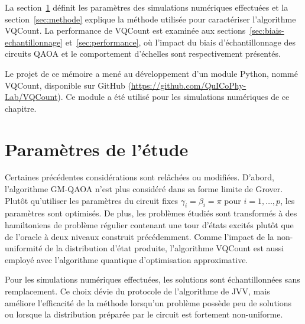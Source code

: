 La section~\ref{sec:parametres-de-etude} définit les paramètres des simulations numériques effectuées et la section~\ref{sec:methode} explique la méthode utilisée pour caractériser l'algorithme VQCount. La performance de VQCount est examinée aux sections~\ref{sec:biais-echantillonnage} et~\ref{sec:performance}, où l'impact du biais d'échantillonnage des circuits QAOA et le comportement d'échelles sont respectivement présentés.

Le projet de ce mémoire a mené au développement d'un module Python, nommé VQCount, disponible sur GitHub (\url{https://github.com/QuICoPhy-Lab/VQCount}). Ce module a été utilisé pour les simulations numériques de ce chapitre. 



\section{Paramètres de l'étude}
\label{sec:parametres-de-etude}


Certaines précédentes considérations sont relâchées ou modifiées. D'abord, 
l'algorithme GM-QAOA n'est plus considéré dans sa forme limite de Grover. Plutôt qu'utiliser les paramètres du circuit fixes $\gamma_{i}=\beta_{i}=\pi$ pour $i=1,\dots,p$, les paramètres sont optimisés. De plus, les problèmes étudiés sont transformés à des hamiltoniens de problème régulier contenant une tour d'états excités plutôt que de l'oracle à deux niveaux construit précédemment. Comme l'impact de la non-uniformité de la distribution d'état produite, l'algorithme VQCount est aussi employé avec l'algorithme quantique d'optimisation approximative.

Pour les simulations numériques effectuées, les solutions sont échantillonnées sans remplacement. Ce choix dévie du protocole de l'algorithme de JVV, mais améliore l'efficacité de la méthode lorsqu'un problème possède peu de solutions ou lorsque la distribution préparée par le circuit est fortement non-uniforme.

